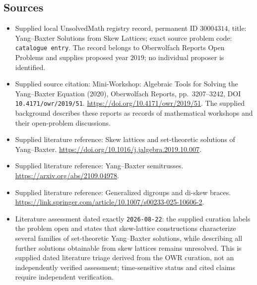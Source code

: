 \documentclass[11pt]{article}
\begin{document}
\subsection{Sources}
\begin{itemize}
\item Supplied local UnsolvedMath registry record, permanent ID \(30004314\), title: Yang--Baxter Solutions from Skew Lattices; exact source problem code: \texttt{catalogue entry}. The record belongs to Oberwolfach Reports Open Problems and supplies proposed year \(2019\); no individual proposer is identified.
\item Supplied source citation: Mini-Workshop: Algebraic Tools for Solving the Yang--Baxter Equation (2020), Oberwolfach Reports, pp.~3207--3242, DOI \texttt{10.4171/owr/2019/51}. \url{https://doi.org/10.4171/owr/2019/51}. The supplied background describes these reports as records of mathematical workshops and their open-problem discussions.
\item Supplied literature reference: Skew lattices and set-theoretic solutions of Yang--Baxter. \url{https://doi.org/10.1016/j.jalgebra.2019.10.007}.
\item Supplied literature reference: Yang--Baxter semitrusses. \url{https://arxiv.org/abs/2109.04978}.
\item Supplied literature reference: Generalized digroups and di-skew braces. \url{https://link.springer.com/article/10.1007/s00233-025-10606-2}.
\item Literature assessment dated exactly \texttt{2026-08-22}: the supplied curation labels the problem open and states that skew-lattice constructions characterize several families of set-theoretic Yang--Baxter solutions, while describing all further solutions obtainable from skew lattices remains unresolved. This is supplied dated literature triage derived from the OWR curation, not an independently verified assessment; time-sensitive status and cited claims require independent verification.
\end{itemize}
\end{document}
